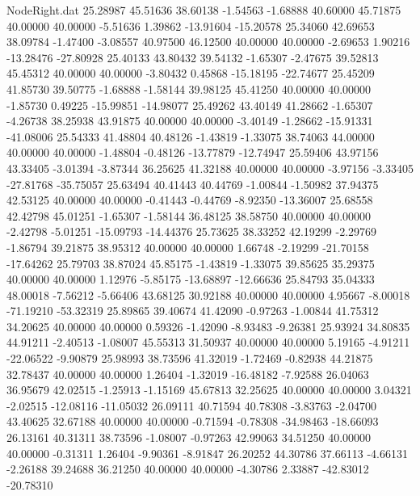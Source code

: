 \begin{filecontents}{NodeRight.dat}
  25.28987   45.51636   38.60138    -1.54563   -1.68888   40.60000   45.71875   40.00000   40.00000   -5.51636    1.39862  -13.91604  -15.20578
  25.34060   42.69653   38.09784    -1.47400   -3.08557   40.97500   46.12500   40.00000   40.00000   -2.69653    1.90216  -13.28476  -27.80928
  25.40133   43.80432   39.54132    -1.65307   -2.47675   39.52813   45.45312   40.00000   40.00000   -3.80432    0.45868  -15.18195  -22.74677
  25.45209   41.85730   39.50775    -1.68888   -1.58144   39.98125   45.41250   40.00000   40.00000   -1.85730    0.49225  -15.99851  -14.98077
  25.49262   43.40149   41.28662    -1.65307   -4.26738   38.25938   43.91875   40.00000   40.00000   -3.40149   -1.28662  -15.91331  -41.08006
  25.54333   41.48804   40.48126    -1.43819   -1.33075   38.74063   44.00000   40.00000   40.00000   -1.48804   -0.48126  -13.77879  -12.74947
  25.59406   43.97156   43.33405    -3.01394   -3.87344   36.25625   41.32188   40.00000   40.00000   -3.97156   -3.33405  -27.81768  -35.75057
  25.63494   40.41443   40.44769    -1.00844   -1.50982   37.94375   42.53125   40.00000   40.00000   -0.41443   -0.44769   -8.92350  -13.36007
  25.68558   42.42798   45.01251    -1.65307   -1.58144   36.48125   38.58750   40.00000   40.00000   -2.42798   -5.01251  -15.09793  -14.44376
  25.73625   38.33252   42.19299    -2.29769   -1.86794   39.21875   38.95312   40.00000   40.00000    1.66748   -2.19299  -21.70158  -17.64262
  25.79703   38.87024   45.85175    -1.43819   -1.33075   39.85625   35.29375   40.00000   40.00000    1.12976   -5.85175  -13.68897  -12.66636
  25.84793   35.04333   48.00018    -7.56212   -5.66406   43.68125   30.92188   40.00000   40.00000    4.95667   -8.00018  -71.19210  -53.32319
  25.89865   39.40674   41.42090    -0.97263   -1.00844   41.75312   34.20625   40.00000   40.00000    0.59326   -1.42090   -8.93483   -9.26381
  25.93924   34.80835   44.91211    -2.40513   -1.08007   45.55313   31.50937   40.00000   40.00000    5.19165   -4.91211  -22.06522   -9.90879
  25.98993   38.73596   41.32019    -1.72469   -0.82938   44.21875   32.78437   40.00000   40.00000    1.26404   -1.32019  -16.48182   -7.92588
  26.04063   36.95679   42.02515    -1.25913   -1.15169   45.67813   32.25625   40.00000   40.00000    3.04321   -2.02515  -12.08116  -11.05032
  26.09111   40.71594   40.78308    -3.83763   -2.04700   43.40625   32.67188   40.00000   40.00000   -0.71594   -0.78308  -34.98463  -18.66093
  26.13161   40.31311   38.73596    -1.08007   -0.97263   42.99063   34.51250   40.00000   40.00000   -0.31311    1.26404   -9.90361   -8.91847
  26.20252   44.30786   37.66113    -4.66131   -2.26188   39.24688   36.21250   40.00000   40.00000   -4.30786    2.33887  -42.83012  -20.78310

\end{filecontents}
